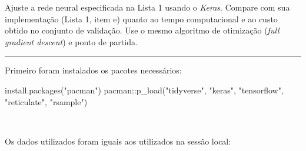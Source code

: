 \documentclass[
  a4paperpaper,
]{article}
\newenvironment{Shaded}{\begin{snugshade}}{\end{snugshade}}
\newcommand{\FunctionTok}[1]{\textcolor[rgb]{0.28,0.35,0.67}{#1}}
\newcommand{\NormalTok}[1]{\textcolor[rgb]{0.00,0.23,0.31}{#1}}
\newcommand{\SpecialCharTok}[1]{\textcolor[rgb]{0.37,0.37,0.37}{#1}}
\newcommand{\StringTok}[1]{\textcolor[rgb]{0.13,0.47,0.30}{#1}}
\begin{document}
Ajuste a rede neural especificada na Lista 1 usando o \emph{Keras}.
Compare com sua implementação (Lista 1, item e) quanto ao tempo
computacional e ao custo obtido no conjunto de validação. Use o mesmo
algoritmo de otimização (\emph{full gradient descent}) e ponto de
partida.

\begin{center}\rule{0.5\linewidth}{0.5pt}\end{center}

Primeiro foram instalados os pacotes necessários: ~

\begin{Shaded}
\begin{Highlighting}[]
\FunctionTok{install.packages}\NormalTok{(}\StringTok{"pacman"}\NormalTok{)}
\NormalTok{pacman}\SpecialCharTok{::}\FunctionTok{p\_load}\NormalTok{(}\StringTok{"tidyverse"}\NormalTok{, }\StringTok{"keras"}\NormalTok{, }\StringTok{"tensorflow"}\NormalTok{, }\StringTok{"reticulate"}\NormalTok{, }\StringTok{"rsample"}\NormalTok{)}
\end{Highlighting}
\end{Shaded}

~

Os dados utilizados foram iguais aos utilizados na sessão local:
\end{document}
